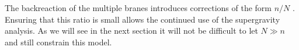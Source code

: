 


The backreaction of the multiple branes introduces corrections of the form $n/N$
\cite{hltw}. Ensuring that this ratio is small allows the continued use of the
supergravity analysis. As we will see in the next section it will not be
difficult to let $N\gg n$ and still constrain this model.


